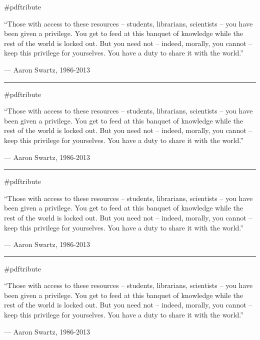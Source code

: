 \documentclass{article}
\begin{document}
\begin{center}
    {\Huge\#pdftribute}
\end{center}

{\large``Those with access to these resources -- students, librarians,
scientists -- you have been given a privilege. You get to feed at this
banquet of knowledge while the rest of the world is locked out. But you need
not -- indeed, morally, you cannot -- keep this privilege for yourselves. You
have a duty to share it with the world.''

--- Aaron Swartz, 1986-2013}

\vspace{0.25in}
\rule{6in}{1px}
\vspace{0.1in}

\begin{center}
    {\Huge\#pdftribute}
\end{center}

{\large``Those with access to these resources -- students, librarians,
scientists -- you have been given a privilege. You get to feed at this
banquet of knowledge while the rest of the world is locked out. But you need
not -- indeed, morally, you cannot -- keep this privilege for yourselves. You
have a duty to share it with the world.''

--- Aaron Swartz, 1986-2013}

\vspace{0.25in}
\rule{6in}{1px}
\vspace{0.1in}

\begin{center}
    {\Huge\#pdftribute}
\end{center}

{\large``Those with access to these resources -- students, librarians,
scientists -- you have been given a privilege. You get to feed at this
banquet of knowledge while the rest of the world is locked out. But you need
not -- indeed, morally, you cannot -- keep this privilege for yourselves. You
have a duty to share it with the world.'' 

--- Aaron Swartz, 1986-2013}

\vspace{0.25in}
\rule{6in}{1px}
\vspace{0.1in}

\begin{center}
    {\Huge\#pdftribute}
\end{center}

{\large``Those with access to these resources -- students, librarians,
scientists -- you have been given a privilege. You get to feed at this
banquet of knowledge while the rest of the world is locked out. But you need
not -- indeed, morally, you cannot -- keep this privilege for yourselves. You
have a duty to share it with the world.'' 

--- Aaron Swartz, 1986-2013}
\end{document}

